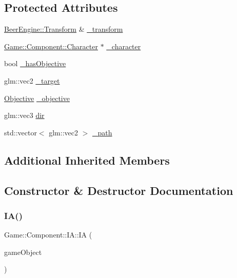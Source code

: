 \subsection*{Protected Attributes}
\begin{DoxyCompactItemize}
\item 
\mbox{\hyperlink{class_beer_engine_1_1_transform}{Beer\+Engine\+::\+Transform}} \& \mbox{\hyperlink{class_game_1_1_component_1_1_i_a_af48be8ae40e3c718b4364d012fe7c349}{\+\_\+transform}}
\item 
\mbox{\hyperlink{class_game_1_1_component_1_1_character}{Game\+::\+Component\+::\+Character}} $\ast$ \mbox{\hyperlink{class_game_1_1_component_1_1_i_a_a83ff83411f922e5b2e0e6befcea81151}{\+\_\+character}}
\item 
bool \mbox{\hyperlink{class_game_1_1_component_1_1_i_a_a90be59b613c01737c0c1ca64dc873585}{\+\_\+has\+Objective}}
\item 
glm\+::vec2 \mbox{\hyperlink{class_game_1_1_component_1_1_i_a_acf4f109df6ed33f1d8f991215d81ec5b}{\+\_\+target}}
\item 
\mbox{\hyperlink{namespace_game_1_1_component_ac1792a9e1e109dc127b77dc4a2cddba1}{Objective}} \mbox{\hyperlink{class_game_1_1_component_1_1_i_a_a1a24550215c263801e59d25d91d315ed}{\+\_\+objective}}
\item 
glm\+::vec3 \mbox{\hyperlink{class_game_1_1_component_1_1_i_a_a4996d461d576a2ffff66e4b33d9d84e2}{dir}}
\item 
std\+::vector$<$ glm\+::vec2 $>$ \mbox{\hyperlink{class_game_1_1_component_1_1_i_a_ad64fdada6ec047f43b16a8898ac44a86}{\+\_\+path}}
\end{DoxyCompactItemize}
\subsection*{Additional Inherited Members}


\subsection{Constructor \& Destructor Documentation}
\mbox{\label{class_game_1_1_component_1_1_i_a_a0193b2ba07bc5bcabe9278a6dcd592bc}} 
\subsubsection{\texorpdfstring{I\+A()}{IA()}}
{\footnotesize\ttfamily Game\+::\+Component\+::\+I\+A\+::\+IA (\begin{DoxyParamCaption}\item[{\mbox{\hyperlink{class_beer_engine_1_1_game_object}{Beer\+Engine\+::\+Game\+Object}} $\ast$}]{game\+Object }\end{DoxyParamCaption})}



